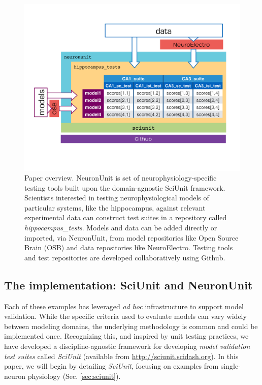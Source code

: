 \documentclass{frontiersSCNS}
\begin{document}
\begin{figure}
\vspace{-45px}
\centering
\includegraphics[scale=0.6]{diagram1.pdf}
\vspace{-65px}
\caption{Paper overview. NeuronUnit is set of neurophysiology-specific testing tools built upon the domain-agnostic SciUnit framework. 
Scientists interested in testing neurophysiological models of particular systems, like the hippocampus, against relevant experimental data can construct test suites in a repository called \textit{hippocampus\_tests}. 
Models and data can be added directly or imported, via NeuronUnit, from model repositories like Open Source Brain (OSB) and data repositories like NeuroElectro. 
Testing tools and test repositories are developed collaboratively using Github.}  
\label{fig:sciunit_overview}\vspace{-10px}
\end{figure}
\leavevmode

\subsection{The implementation: SciUnit and NeuronUnit}
Each of these examples has leveraged \emph{ad hoc} infrastructure to support model validation. 
While the specific criteria used to evaluate models can vary widely between modeling domains, the underlying methodology is common and could be implemented once. 
Recognizing this, and inspired by unit testing practices, we have developed a discipline-agnostic framework for developing \emph{model validation test suites} called \textit{SciUnit} \citep{omar_sciunit_2013} (available from \url{http://sciunit.scidash.org}). 
In this paper, we will begin by detailing \textit{SciUnit}, focusing on examples from single-neuron physiology (Sec. \ref{sec:sciunit}). 
\end{document}
